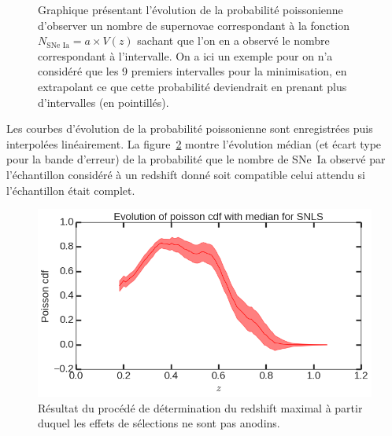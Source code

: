 \documentclass[a4paper, 12pt, svgnames]{article}
\begin{document}
\begin{figure}[htbp!]
    \centering
    \captionsetup{justification=centering}
    \caption{Graphique présentant l'évolution de la probabilité poissonienne
        d'observer un nombre de supernovae correspondant à la fonction
        $N_{\text{SNe~Ia}} = a\times V(z)$ sachant que l'on en a observé le
        nombre correspondant à l'intervalle. On a ici un exemple pour on n'a
        considéré que les 9 premiers intervalles pour la minimisation, en
        extrapolant ce que cette probabilité deviendrait en prenant plus
        d'intervalles (en pointillés).}
    \label{fig:zmax_method}
\end{figure}

Les courbes d'évolution de la probabilité poissonienne sont enregistrées puis
interpolées linéairement. La figure~\ref{fig:zmax_result} montre l'évolution
médian (et écart type pour la bande d'erreur) de la probabilité que le nombre de
SNe~Ia observé par l'échantillon considéré à un redshift donné soit compatible
celui attendu si l'échantillon était complet.

\begin{figure}[htbp!]
    \centering
    \includegraphics[width=.5\linewidth]{Rapport_figures/zmax_snls.png}
    \captionsetup{justification=centering}
    \caption{Résultat du procédé de détermination du redshift maximal à partir
    duquel les effets de sélections ne sont pas anodins.}
    \label{fig:zmax_result}
\end{figure}
\end{document}

